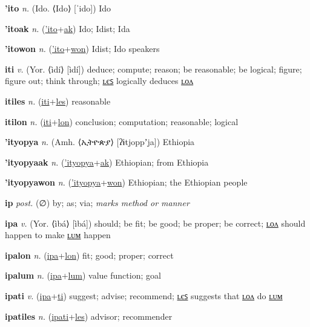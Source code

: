 \textbf{\hypertarget{'ito}{'ito}} \textit{n.} (Ido. ⟨Ido⟩ [ˈido])
Ido

\textbf{\hypertarget{'itoak}{'itoak}} \textit{n.} (\hyperlink{'ito}{'ito}+\allowbreak \hyperlink{ak}{ak})
Ido; Idist; Ida

\textbf{\hypertarget{'itowon}{'itowon}} \textit{n.} (\hyperlink{'ito}{'ito}+\allowbreak \hyperlink{won}{won})
Idist; Ido speakers

\textbf{\hypertarget{iti}{iti}} \textit{v.} (Yor. ⟨ìdí⟩ [ìdí])
deduce; compute; reason; be reasonable; be logical; figure; figure out; think through; \hyperlink{itiles}{ʟєꜱ} logically deduces \hyperlink{itilon}{ʟᴏᴧ}

\textbf{\hypertarget{itiles}{itiles}} \textit{n.} (\hyperlink{iti}{iti}+\allowbreak \hyperlink{les}{les})
reasonable

\textbf{\hypertarget{itilon}{itilon}} \textit{n.} (\hyperlink{iti}{iti}+\allowbreak \hyperlink{lon}{lon})
conclusion; computation; reasonable; logical

\textbf{\hypertarget{'ityopya}{'ityopya}} \textit{n.} (Amh. ⟨{\ethiopic{}ኢትዮጵያ}⟩ [ʔɨtjoppʼja])
Ethiopia

\textbf{\hypertarget{'ityopyaak}{'ityopyaak}} \textit{n.} (\hyperlink{'ityopya}{'ityopya}+\allowbreak \hyperlink{ak}{ak})
Ethiopian; from Ethiopia

\textbf{\hypertarget{'ityopyawon}{'ityopyawon}} \textit{n.} (\hyperlink{'ityopya}{'ityopya}+\allowbreak \hyperlink{won}{won})
Ethiopian; the Ethiopian people

\textbf{\hypertarget{ip}{ip}} \textit{post.} (∅)
by; as; via; \textit{marks method or manner}

\textbf{\hypertarget{ipa}{ipa}} \textit{v.} (Yor. ⟨ìbá⟩ [ìbá])
should; be fit; be good; be proper; be correct; \hyperlink{ipalon}{ʟᴏᴧ} should happen to make \hyperlink{ipalum}{ʟᴜᴍ} happen

\textbf{\hypertarget{ipalon}{ipalon}} \textit{n.} (\hyperlink{ipa}{ipa}+\allowbreak \hyperlink{lon}{lon})
fit; good; proper; correct

\textbf{\hypertarget{ipalum}{ipalum}} \textit{n.} (\hyperlink{ipa}{ipa}+\allowbreak \hyperlink{lum}{lum})
value function; goal

\textbf{\hypertarget{ipati}{ipati}} \textit{v.} (\hyperlink{ipa}{ipa}+\allowbreak \hyperlink{ti}{ti})
suggest; advise; recommend; \hyperlink{ipatiles}{ʟєꜱ} suggests that \hyperlink{ipatilon}{ʟᴏᴧ} do \hyperlink{ipatilum}{ʟᴜᴍ}

\textbf{\hypertarget{ipatiles}{ipatiles}} \textit{n.} (\hyperlink{ipati}{ipati}+\allowbreak \hyperlink{les}{les})
advisor; recommender

